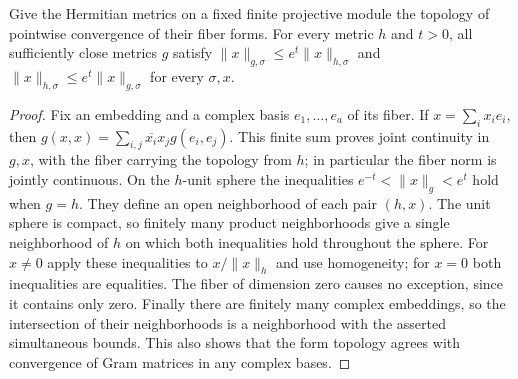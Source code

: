 \begin{lemma}
\label{lem:metric-topology-comparison}
\leanok
{}
Give the Hermitian metrics on a fixed finite projective module the topology
of pointwise convergence of their fiber forms. For every metric $h$ and
$t>0$, all sufficiently close metrics $g$ satisfy
$\|x\|_{g,\sigma}\leq e^t\|x\|_{h,\sigma}$ and
$\|x\|_{h,\sigma}\leq e^t\|x\|_{g,\sigma}$ for every $\sigma,x$.
\end{lemma}
\begin{proof}
Fix an embedding and a complex basis $e_1,\ldots,e_a$ of its fiber.
If $x=\sum_i x_i e_i$, then
$g(x,x)=\sum_{i,j}\overline{x_i}x_j g(e_i,e_j)$.
This finite sum proves joint continuity in $g,x$, with the fiber carrying
the topology from $h$; in particular the fiber norm is jointly continuous.
On the $h$-unit sphere the inequalities
$e^{-t}<\|x\|_g<e^t$ hold when $g=h$.
They define an open neighborhood of each pair $(h,x)$.
The unit sphere is compact, so finitely many product neighborhoods give
a single neighborhood of $h$ on which both inequalities hold throughout
the sphere. For $x\ne0$ apply these inequalities to
$x/\|x\|_h$ and use homogeneity; for $x=0$ both inequalities are equalities.
The fiber of dimension zero causes no exception, since it contains only
zero. Finally there are finitely many complex embeddings, so the intersection
of their neighborhoods is a neighborhood with the asserted simultaneous bounds.
This also shows that the form topology agrees with convergence of Gram
matrices in any complex bases.
\end{proof}

